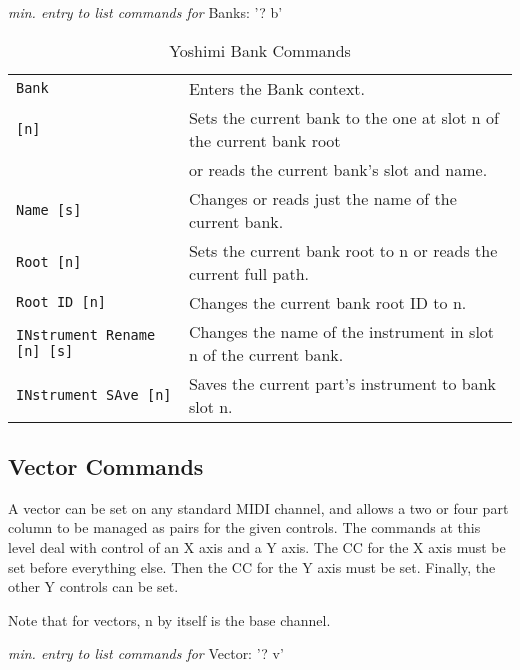 \textsl{min. entry to list commands for} Banks:  '? b'

   \begin{table}[H]
      \centering
      \caption{Yoshimi Bank Commands}
\label{table:yoshimi_text_bank_commands}
      \begin{tabular}{l l}

   \texttt{Bank} &
   Enters the Bank context. \\
   \texttt{[n]} &
   Sets the current bank to the one at slot n of the current bank root \\
   \texttt{  } &
   or reads the current bank's slot and name. \\
  \texttt{Name [s]} &
  Changes or reads just the name of the current bank. \\
  \texttt{Root [n]} &
  Sets the current bank root to n or reads the current full path. \\
  \texttt{Root ID [n]} &
  Changes the current bank root ID to n.  \\
  \texttt{INstrument Rename [n] [s]} &
  Changes the name of the instrument in slot n of the current bank.  \\
  \texttt{INstrument SAve [n]} &
  Saves the current part's instrument to bank slot n.  \\

        \end{tabular}
   \end{table}
\pagebreak
\subsection{Vector Commands}
\label{subsec:command_line_vector_command_list}
   A vector can be set on any standard MIDI channel, and allows a two or four
   part column to be managed as pairs for the given controls.
   The commands at this level deal with control of an X axis and a Y axis.
   The CC for the X axis must be set before everything else.  Then the CC for
   the Y axis must be set.  Finally, the other Y controls can be set.

   Note that for vectors, n by itself is the base channel.

   \textsl{min. entry to list commands for} Vector:  '? v'

